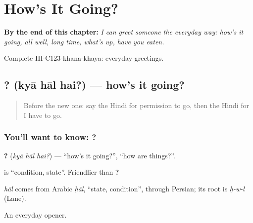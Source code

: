 
\chapter{How's It Going?}
\label{ch:hi-hows-it-going}

\begin{chapteropening}
\textbf{By the end of this chapter:} \emph{I can greet someone the everyday way: how's it going, all well, long time, what's up, have you eaten.}

Complete HI-C123-khana-khaya: everyday greetings.
\end{chapteropening}

\section[\texorpdfstring{\hi{क्या} \hi{हाल} \hi{है}? (kyā hāl hai?)}{क्या हाल है? (kyā hāl hai?)}]{  ? (kyā hāl hai?) — how's it going?}

\label{lesson:HI-C123-kyahaal}



\begin{quote}
Before the new one: say the Hindi for permission to go, then the Hindi for I have to go.
\end{quote}

\subsection*{You'll want to know:   ?}
\textbf{  ?} (\emph{kyā hāl hai?}) — \textquotedblleft{}how's it going?\textquotedblright{}, \textquotedblleft{}how are things?\textquotedblright{}.

\textbf{} is \textquotedblleft{}condition, state\textquotedblright{}. Friendlier than \textbf{  ?}

\begin{cousinweb}
\emph{hāl} comes from Arabic \emph{ḥāl}, \textquotedblleft{}state, condition\textquotedblright{}, through Persian; its root is \emph{ḥ-w-l} (Lane).
\end{cousinweb}

\begin{grammarlens}[title={What you've built}]
An everyday opener.
\end{grammarlens}

